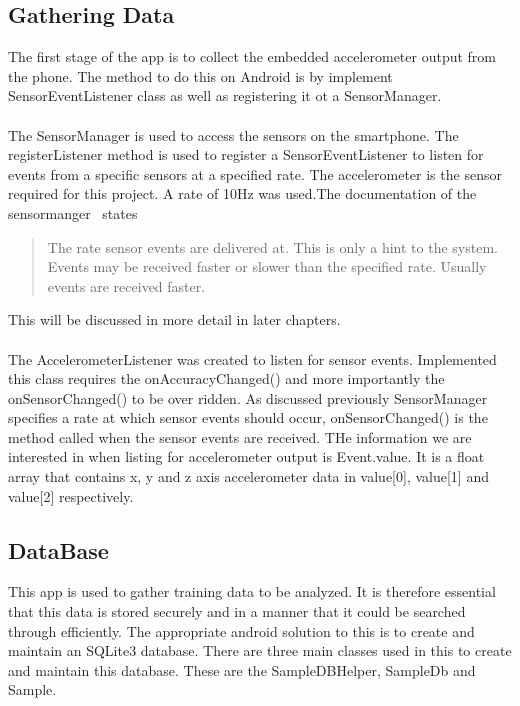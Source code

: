 \subsection{Gathering Data} %
\label{sub:data_gathering}
The first stage of the app is to collect the embedded accelerometer output from the phone. The method to do this on Android is by implement SensorEventListener class as well as registering it ot a SensorManager. 
\paragraph{}
The SensorManager is used to access the sensors on the smartphone. The registerListener method is used to register a SensorEventListener to listen for events from a specific sensors at a specified rate. The accelerometer is the sensor required for this project. A rate of 10Hz was used.The documentation of the sensormanger~\cite{android2013manager} states
\begin{quote}
The rate sensor events are delivered at. This is only a hint to the system. Events may be received faster or slower than the specified rate. Usually events are received faster.
\end{quote}
This will be discussed in more detail in later chapters.
\paragraph{}
The AccelerometerListener was created to listen for sensor events. Implemented this class requires the onAccuracyChanged() and more importantly the onSensorChanged() to be over ridden. As discussed previously SensorManager specifies a rate at which sensor events should occur, onSensorChanged() is the method called when the sensor events are received. THe information we are interested in when listing for accelerometer output is Event.value. It is a float array that contains x, y and z axis accelerometer data in value[0], value[1] and value[2] respectively. 

\subsection{DataBase} %
\label{sub:data_gathering}
This app is used to gather training data to be analyzed. It is therefore essential that this data is stored securely and in a manner that it could be searched through efficiently. The appropriate android solution to this is to create and maintain an SQLite3 database. There are three main classes used in this to create and maintain this database. These are the SampleDBHelper, SampleDb and Sample. 
